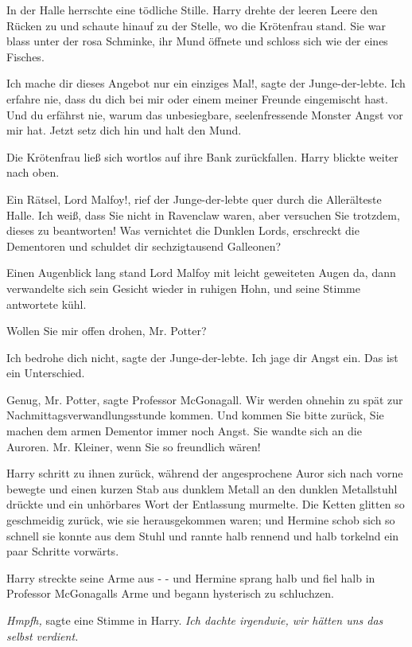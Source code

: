 In der Halle herrschte eine tödliche Stille. Harry drehte der leeren Leere den
Rücken zu und schaute hinauf zu der Stelle, wo die Krötenfrau stand. Sie war
blass unter der rosa Schminke, ihr Mund öffnete und schloss sich wie der eines
Fisches.

\glqq Ich mache dir dieses Angebot nur ein einziges Mal!\grqq{}, sagte der
Junge-der-lebte. \glqq Ich erfahre nie, dass du dich bei mir oder einem meiner
Freunde eingemischt hast. Und du erfährst nie, warum das unbesiegbare,
seelenfressende Monster Angst vor mir hat. Jetzt setz dich hin und halt den
Mund.\grqq{}

Die Krötenfrau ließ sich wortlos auf ihre Bank zurückfallen. Harry blickte
weiter nach oben.

\glqq Ein Rätsel, Lord Malfoy!\grqq{}, rief der Junge-der-lebte quer durch die
Allerälteste Halle. \glqq Ich weiß, dass Sie nicht in Ravenclaw waren, aber
versuchen Sie trotzdem, dieses zu beantworten! Was vernichtet die Dunklen Lords,
erschreckt die Dementoren und schuldet dir sechzigtausend Galleonen?\grqq{}

Einen Augenblick lang stand Lord Malfoy mit leicht geweiteten Augen da, dann
verwandelte sich sein Gesicht wieder in ruhigen Hohn, und seine Stimme
antwortete kühl.

\glqq Wollen Sie mir offen drohen, Mr. Potter?\grqq{}

\glqq Ich bedrohe dich nicht\grqq{}, sagte der Junge-der-lebte. \glqq Ich jage
dir Angst ein. Das ist ein Unterschied.\grqq{}

\glqq Genug, Mr. Potter\grqq{}, sagte Professor McGonagall. \glqq Wir werden
ohnehin zu spät zur Nachmittagsverwandlungsstunde kommen. Und kommen Sie bitte
zurück, Sie machen dem armen Dementor immer noch Angst.\grqq{} Sie wandte sich
an die Auroren. \glqq Mr. Kleiner, wenn Sie so freundlich wären!\grqq{}

Harry schritt zu ihnen zurück, während der angesprochene Auror sich nach vorne
bewegte und einen kurzen Stab aus dunklem Metall an den dunklen Metallstuhl
drückte und ein unhörbares Wort der Entlassung murmelte. Die Ketten glitten so
geschmeidig zurück, wie sie herausgekommen waren; und Hermine schob sich so
schnell sie konnte aus dem Stuhl und rannte halb rennend und halb torkelnd ein
paar Schritte vorwärts.

Harry streckte seine Arme aus - - und Hermine sprang halb und fiel halb in
Professor McGonagalls Arme und begann hysterisch zu schluchzen.

\emph{Hmpfh,} sagte eine Stimme in Harry. \emph{Ich dachte irgendwie, wir hätten
uns das selbst verdient.}

